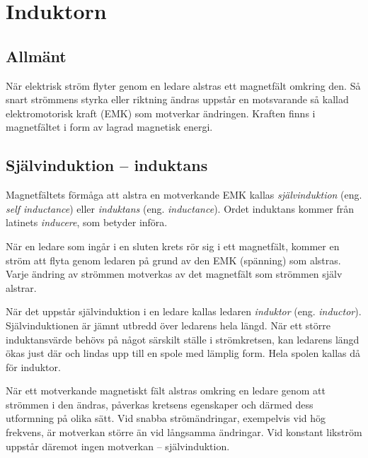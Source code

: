 
\section{Induktorn}

\subsection{Allmänt}
\label{induktor_allmänt}

När elektrisk ström flyter genom en ledare alstras ett magnetfält omkring den.
Så snart strömmens styrka eller riktning ändras uppstår en motsvarande så kallad
elektromotorisk kraft (EMK) som motverkar ändringen.
Kraften finns i magnetfältet i form av lagrad magnetisk energi.


\subsection{Självinduktion -- induktans}

Magnetfältets förmåga att alstra en motverkande EMK kallas
\emph{självinduktion} (eng. \emph{self inductance}) eller
\emph{induktans} (eng. \emph{inductance}).
Ordet induktans kommer från latinets \emph{inducere}, som betyder införa.

När en ledare som ingår i en sluten krets rör sig i ett magnetfält, kommer
en ström att flyta genom ledaren på grund av den EMK (spänning) som alstras.
Varje ändring av strömmen motverkas av det magnetfält som strömmen själv
alstrar.

När det uppstår självinduktion i en ledare kallas ledaren \emph{induktor}
(eng. \emph{inductor}).
Självinduktionen är jämnt utbredd över ledarens hela längd. När ett större
induktansvärde behövs på något särskilt ställe i strömkretsen, kan ledarens
längd ökas just där och lindas upp till en spole med lämplig form.
Hela spolen kallas då för induktor.

När ett motverkande magnetiskt fält alstras omkring en ledare genom att strömmen
i den ändras, påverkas kretsens egenskaper och därmed dess utformning på olika
sätt.
Vid snabba strömändringar, exempelvis vid hög frekvens, är motverkan större än
vid långsamma ändringar.
Vid konstant likström uppstår däremot ingen motverkan -- självinduktion.

